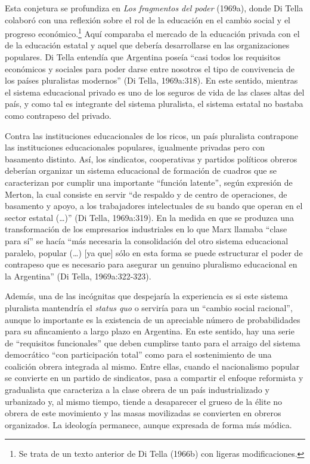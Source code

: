 Esta conjetura se profundiza en \emph{Los fragmentos del poder} (1969a), donde Di Tella colaboró con una reflexión sobre el rol de la educación en el cambio social y el progreso económico.\footnote{Se trata de un texto anterior de Di Tella (1966b) con ligeras modificaciones.} Aquí comparaba el mercado de la educación privada con el de la educación estatal y aquel que debería desarrollarse en las organizaciones populares. Di Tella entendía que Argentina poseía ``casi todos los requisitos económicos y sociales para poder darse entre nosotros el tipo de convivencia de los países pluralistas modernos'' (Di Tella, 1969a:318). En este sentido, mientras el sistema educacional privado es uno de los seguros de vida de las clases altas del país, y como tal es integrante del sistema pluralista, el sistema estatal no bastaba como contrapeso del privado.

Contra las instituciones educacionales de los ricos, un país pluralista contrapone las instituciones educacionales populares, igualmente privadas pero con basamento distinto. Así, los sindicatos, cooperativas y partidos políticos obreros deberían organizar un sistema educacional de formación de cuadros que se caracterizan por cumplir una importante ``función latente'', según expresión de Merton, la cual consiste en servir ``de respaldo y de centro de operaciones, de basamento y apoyo, a los trabajadores intelectuales de su bando que operan en el sector estatal (\ldots)'' (Di Tella, 1969a:319). En la medida en que se produzca una transformación de los empresarios industriales en lo que Marx llamaba ``clase para sí'' se hacía ``más necesaria la consolidación del otro sistema educacional paralelo, popular (\ldots) {[}ya que{]} sólo en esta forma se puede estructurar el poder de contrapeso que es necesario para asegurar un genuino pluralismo educacional en la Argentina'' (Di Tella, 1969a:322-323).

Además, una de las incógnitas que despejaría la experiencia es si este sistema pluralista mantendría el \emph{status quo} o serviría para un ``cambio social racional'', aunque lo importante es la existencia de un apreciable número de probabilidades para su afincamiento a largo plazo en Argentina. En este sentido, hay una serie de ``requisitos funcionales'' que deben cumplirse tanto para el arraigo del sistema democrático ``con participación total'' como para el sostenimiento de una coalición obrera integrada al mismo. Entre ellas, cuando el nacionalismo popular se convierte en un partido de sindicatos, pasa a compartir el enfoque reformista y gradualista que caracteriza a la clase obrera de un país industrializado y urbanizado y, al mismo tiempo, tiende a desaparecer el grueso de la élite no obrera de este movimiento y las masas movilizadas se convierten en obreros organizados. La ideología permanece, aunque expresada de forma más módica.

